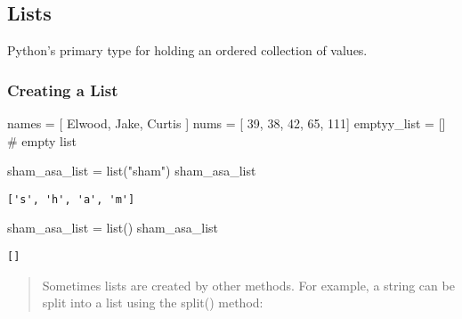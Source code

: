 \documentclass[
  letterpaper,
  DIV=11,
  numbers=noendperiod]{scrreprt}
\newenvironment{Shaded}{\begin{snugshade}}{\end{snugshade}}
\newcommand{\BuiltInTok}[1]{\textcolor[rgb]{0.00,0.46,0.62}{#1}}
\newcommand{\BuiltInTok}[1]{\textcolor[rgb]{0.00,0.48,0.65}{#1}}
\newcommand{\CommentTok}[1]{\textcolor[rgb]{0.37,0.37,0.37}{#1}}
\newcommand{\DecValTok}[1]{\textcolor[rgb]{0.68,0.00,0.00}{#1}}
\newcommand{\NormalTok}[1]{\textcolor[rgb]{0.00,0.46,0.62}{#1}}
\newcommand{\OperatorTok}[1]{\textcolor[rgb]{0.37,0.37,0.37}{#1}}
\newcommand{\NormalTok}[1]{\textcolor[rgb]{0.00,0.48,0.65}{#1}}
\newcommand{\OperatorTok}[1]{\textcolor[rgb]{0.37,0.37,0.37}{#1}}
\newcommand{\StringTok}[1]{\textcolor[rgb]{0.13,0.47,0.30}{#1}}
\begin{document}
\begin{Shaded}
\begin{Highlighting}[]
\hypertarget{lists}{%
\section{Lists}\label{lists}}

Python's primary type for holding an ordered collection of values.

\hypertarget{creating-a-list}{%
\subsubsection{Creating a List}\label{creating-a-list}}

\begin{Shaded}
\begin{Highlighting}[]
\NormalTok{names }\OperatorTok{=}\NormalTok{ [ }\StringTok{\textquotesingle{}Elwood\textquotesingle{}}\NormalTok{, }\StringTok{\textquotesingle{}Jake\textquotesingle{}}\NormalTok{, }\StringTok{\textquotesingle{}Curtis\textquotesingle{}}\NormalTok{ ]}
\NormalTok{nums }\OperatorTok{=}\NormalTok{ [ }\DecValTok{39}\NormalTok{, }\DecValTok{38}\NormalTok{, }\DecValTok{42}\NormalTok{, }\DecValTok{65}\NormalTok{, }\DecValTok{111}\NormalTok{]}
\NormalTok{emptyy\_list }\OperatorTok{=}\NormalTok{ [] }\CommentTok{\# empty list}
\end{Highlighting}
\end{Shaded}

\begin{Shaded}
\begin{Highlighting}[]
\NormalTok{sham\_asa\_list }\OperatorTok{=} \BuiltInTok{list}\NormalTok{(}\StringTok{"sham"}\NormalTok{)}
\NormalTok{sham\_asa\_list }
\end{Highlighting}
\end{Shaded}

\begin{verbatim}
['s', 'h', 'a', 'm']
\end{verbatim}

\begin{Shaded}
\begin{Highlighting}[]
\NormalTok{sham\_asa\_list }\OperatorTok{=} \BuiltInTok{list}\NormalTok{()}
\NormalTok{sham\_asa\_list}
\end{Highlighting}
\end{Shaded}

\begin{verbatim}
[]
\end{verbatim}

\begin{quote}
Sometimes lists are created by other methods. For example, a string can
be split into a list using the split() method:
\end{quote}


\end{Highlighting}
\end{Shaded}
\end{document}
